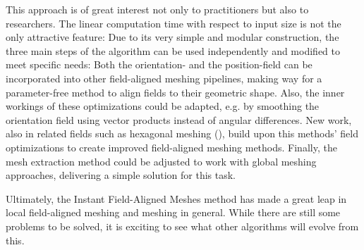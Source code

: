 \documentclass{ACGSeminar}
\begin{document}
This approach is of great interest not only to practitioners but also to researchers. The linear computation time with respect to input size is not the only attractive feature: Due to its very simple and modular construction, the three main steps of the algorithm can be used independently and modified to meet specific needs: Both the orientation- and the position-field can be incorporated into other field-aligned meshing pipelines, making way for a parameter-free method to align fields to their geometric shape. Also, the inner workings of these optimizations could be adapted, e.g. by smoothing the orientation field using vector products instead of angular differences. New work, also in related fields such as hexagonal meshing (\cite{gao2017robust}), build upon this methods' field optimizations to create improved field-aligned meshing methods. Finally, the mesh extraction method could be adjusted to work with global meshing approaches, delivering a simple solution for this task.\bigskip

Ultimately, the Instant Field-Aligned Meshes method has made a great leap in local field-aligned meshing and meshing in general. While there are still some problems to be solved, it is exciting to see what other algorithms will evolve from this.

\label{cha:references}
\printbibliography
\end{document}
